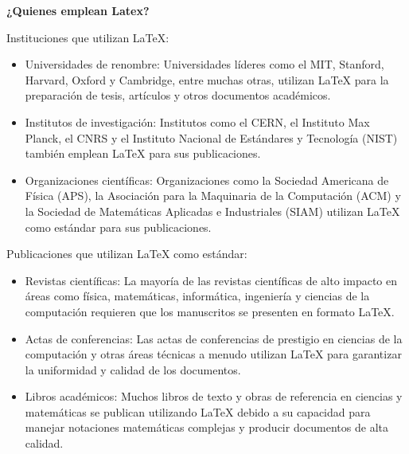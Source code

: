 \documentclass[10pt]{article}
\begin{document}



\textbf{¿Quienes emplean Latex?}

Instituciones que utilizan LaTeX:

\begin{itemize}
	\item Universidades de renombre: Universidades líderes como el MIT, Stanford, Harvard, Oxford y Cambridge, entre muchas otras, utilizan LaTeX para la preparación de tesis, artículos y otros documentos académicos.
	\item Institutos de investigación: Institutos como el CERN, el Instituto Max Planck, el CNRS y el Instituto Nacional de Estándares y Tecnología (NIST) también emplean LaTeX para sus publicaciones.
	\item Organizaciones científicas: Organizaciones como la Sociedad Americana de Física (APS), la Asociación para la Maquinaria de la Computación (ACM) y la Sociedad de Matemáticas Aplicadas e Industriales (SIAM) utilizan LaTeX como estándar para sus publicaciones.
\end{itemize}

Publicaciones que utilizan LaTeX como estándar:

\begin{itemize}
	\item Revistas científicas: La mayoría de las revistas científicas de alto impacto en áreas como física, matemáticas, informática, ingeniería y ciencias de la computación requieren que los manuscritos se presenten en formato LaTeX.
	\item Actas de conferencias: Las actas de conferencias de prestigio en ciencias de la computación y otras áreas técnicas a menudo utilizan LaTeX para garantizar la uniformidad y calidad de los documentos.
	\item Libros académicos: Muchos libros de texto y obras de referencia en ciencias y matemáticas se publican utilizando LaTeX debido a su capacidad para manejar notaciones matemáticas complejas y producir documentos de alta calidad.
\end{itemize}
\end{document}
